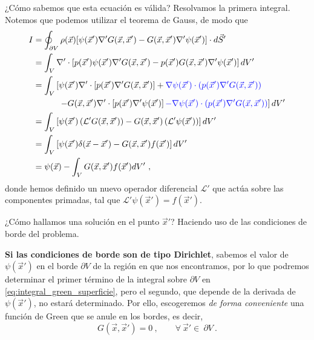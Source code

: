 ¿Cómo sabemos que esta ecuación es válida? Resolvamos la primera integral. Notemos que podemos utilizar el teorema de Gauss, de modo que
\begin{align}
    I & = \oint_{\partial V} \rho(\vec{x})[\psi(\vec{x}') \nabla' G(\vec{x}, \vec{x}') - G(\vec{x}, \vec{x}') \nabla' \psi(\vec{x}')] \cdot d\vec{S}' \label{eq:integral_green_superficie} \\
    & = \int_V \nabla' \cdot \left[ p(\vec{x}') \psi(\vec{x}') \nabla' G(\vec{x}, \vec{x}') - p(\vec{x}') G(\vec{x}, \vec{x}') \nabla' \psi(\vec{x}') \right] dV' \\
    & = \int_V \left[\psi(\vec{x}') \nabla' \cdot \left[ p(\vec{x}')  \nabla' G(\vec{x}, \vec{x}')\right] + \textcolor{blue}{\nabla \psi(\vec{x}') \cdot (p(\vec{x}') \nabla' G(\vec{x}, \vec{x}') )} \right. \nonumber \\
    & \qquad \quad \left. -  G(\vec{x}, \vec{x}') \nabla' \cdot \left[p(\vec{x}') \nabla' \psi(\vec{x}')\right] \textcolor{blue}{- \nabla \psi(\vec{x}') \cdot (p(\vec{x}') \nabla' G(\vec{x}, \vec{x}') )} \right] dV' \\
    & = \int_V \left[ \psi(\vec{x}') \left( \mathcal{L}' G(\vec{x}, \vec{x}') \right) - G(\vec{x}, \vec{x}') \left( \mathcal{L}' \psi(\vec{x}') \right) \right] dV' \\
    & = \int_V \left[ \psi(\vec{x}') \delta(\vec{x} - \vec{x}') - G(\vec{x}, \vec{x}') f(\vec{x}') \right] dV' \\
    & = \psi(\vec{x}) - \int_V G(\vec{x}, \vec{x}') f(\vec{x}') dV' \ ,
\end{align}
donde hemos definido un nuevo operador diferencial $\mathcal{L}'$ que actúa sobre las componentes primadas, tal que $\mathcal{L}' \psi(\vec{x}') = f(\vec{x}')$.

¿Cómo hallamos una solución en el punto $\vec{x}'$? Haciendo uso de las condiciones de borde del problema.

\textbf{Si las condiciones de borde son de tipo Dirichlet}, sabemos el valor de $\psi(\vec{x}')$ en el borde $\partial V$ de la región en que nos encontramos, por lo que podremos determinar el primer término de la integral sobre $\partial V$ en \eqref{eq:integral_green_superficie}, pero el segundo, que depende de la derivada de $\psi(\vec{x}')$, no estará determinado. Por ello, escogeremos \emph{de forma conveniente} una función de Green que se anule en los bordes, es decir,
\begin{equation}
    G(\vec{x}, \vec{x}') = 0 \ , \qquad \forall \ \vec{x}' \in \ \partial V \ .
\end{equation}

